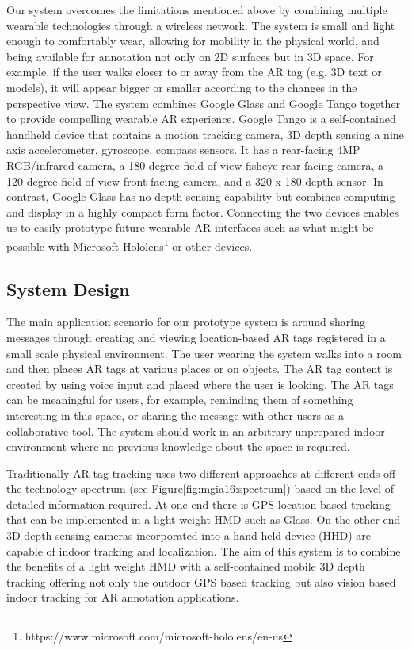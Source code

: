 Our system overcomes the limitations mentioned above by combining multiple wearable technologies through a wireless network. The system is small and light enough to comfortably wear, allowing for mobility in the physical world, and being available for annotation not only on 2D surfaces but in 3D space. For example, if the user walks closer to or away from the AR tag (e.g. 3D text or models), it will appear bigger or smaller according to the changes in the perspective view. The system combines Google Glass and Google Tango together to provide compelling wearable AR experience. Google Tango is a self-contained handheld device that contains a motion tracking camera, 3D depth sensing a nine axis accelerometer, gyroscope, compass sensors. It has a rear-facing 4MP RGB/infrared camera, a 180-degree field-of-view fisheye rear-facing camera, a 120-degree field-of-view front facing camera, and a 320 x 180 depth sensor. In contrast, Google Glass has no depth sensing capability but combines computing and display in a highly compact form factor. Connecting the two devices enables us to easily prototype future wearable AR interfaces such as what might be possible with Microsoft Hololens\footnote{https://www.microsoft.com/microsoft-hololens/en-us} or other devices.

\subsection{System Design}

The main application scenario for our prototype system is around sharing messages through creating and viewing location-based AR tags registered in a small scale physical environment. The user wearing the system walks into a room and then places AR tags at various places or on objects. The AR tag content is created by using voice input and placed where the user is looking. The AR tags can be meaningful for users, for example, reminding them of something interesting in this space, or sharing the message with other users as a collaborative tool. The system should work in an arbitrary unprepared indoor environment where no previous knowledge about the space is required. 

Traditionally AR tag tracking uses two different approaches at different  ends off the technology spectrum (see Figure\ref{fig:mgia16:spectrum}) based on the level of detailed information required. At one end there is GPS location-based tracking that can be implemented in a light weight HMD such as Glass. On the other end 3D depth sensing cameras incorporated into a hand-held device (HHD) are capable of indoor tracking and localization. The aim of this system is to combine the benefits of a light weight HMD with a self-contained mobile 3D depth tracking offering not only the outdoor GPS based tracking but also vision based indoor tracking  for AR annotation applications. 


